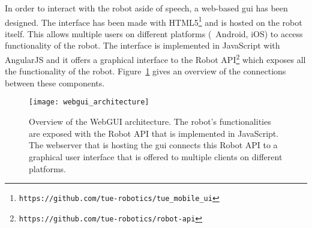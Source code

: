 In order to interact with the robot aside of speech, a web-based \gls{gui} has been designed.
The interface has been made with HTML5\footnote{\texttt{https://github.com/tue-robotics/tue\_mobile\_ui}} and is hosted on the robot itself.
This allows multiple users on different platforms (\eg\ Android, iOS) to access functionality of the robot. The interface is implemented in JavaScript with AngularJS and it offers a graphical interface to the Robot API\footnote{\texttt{https://github.com/tue-robotics/robot-api}} which exposes all the functionality of the robot.
Figure~\ref{fig:webgui_architecture} gives an overview of the connections between these components.

\begin{figure}[H]
	\texttt{[image: webgui\_architecture]}
	\caption{
		Overview of the WebGUI architecture.
		The robot's functionalities are exposed with the Robot API that is implemented in JavaScript.
		The webserver that is hosting the \protect\gls{gui} connects this Robot API to a graphical user interface that is offered to multiple clients on different platforms.}
	\label{fig:webgui_architecture}
\end{figure}
